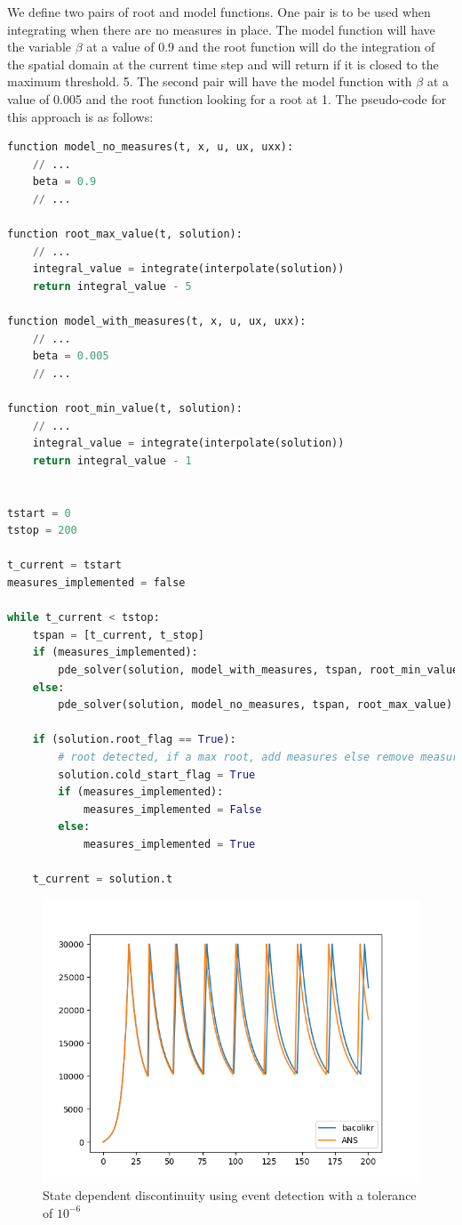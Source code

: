 \documentclass{article}
\begin{document}
We define two pairs of root and model functions. One pair is to be used when integrating when there are no measures in place. The model function will have the variable $\beta$ at a value of 0.9 and the root function will do the integration of the spatial domain at the current time step and will return if it is closed to the maximum threshold. 5. The second pair will have the model function with $\beta$ at a value of 0.005 and the root function looking for a root at 1. The pseudo-code for this approach is as follows:

\begin{minipage}{\linewidth}
\begin{lstlisting}[language=Python]
function model_no_measures(t, x, u, ux, uxx):
	// ...
	beta = 0.9
	// ...
	
function root_max_value(t, solution):
	// ...
	integral_value = integrate(interpolate(solution))
	return integral_value - 5
	
function model_with_measures(t, x, u, ux, uxx):
	// ...
	beta = 0.005
	// ...
	
function root_min_value(t, solution):
	// ...
	integral_value = integrate(interpolate(solution))
	return integral_value - 1


tstart = 0
tstop = 200
		
t_current = tstart
measures_implemented = false

while t_current < tstop:
	tspan = [t_current, t_stop]
	if (measures_implemented):
		pde_solver(solution, model_with_measures, tspan, root_min_value)
	else:
		pde_solver(solution, model_no_measures, tspan, root_max_value)
		
	if (solution.root_flag == True):
		# root detected, if a max root, add measures else remove measures
		solution.cold_start_flag = True
		if (measures_implemented):
			measures_implemented = False
		else:
			measures_implemented = True
		
	t_current = solution.t

\end{lstlisting}
\end{minipage}


\begin{figure}[H]
\centering
\includegraphics[width=0.7\linewidth]{./figures/pde_state_disc_event_tol_6}
\caption{State dependent discontinuity using event detection with a tolerance of $10^{-6}$}
\label{fig:pde_state_disc_event_tol_6}
\end{figure}
\end{document}
